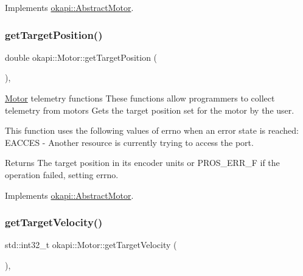 Implements \mbox{\hyperlink{classokapi_1_1AbstractMotor_aa34fefa954fbff26e3d68e59c4f10964}{okapi\+::\+Abstract\+Motor}}.

\mbox{\label{classokapi_1_1Motor_af575af2b4d4cf5aea6e8aac50ef1cbbd}} 
\subsubsection{\texorpdfstring{getTargetPosition()}{getTargetPosition()}}
{\footnotesize\ttfamily double okapi\+::\+Motor\+::get\+Target\+Position (\begin{DoxyParamCaption}{ }\end{DoxyParamCaption})\hspace{0.3cm}{\ttfamily [override]}, {\ttfamily [virtual]}}

\mbox{\hyperlink{classokapi_1_1Motor}{Motor}} telemetry functions These functions allow programmers to collect telemetry from motors Gets the target position set for the motor by the user.

This function uses the following values of errno when an error state is reached\+: E\+A\+C\+C\+ES -\/ Another resource is currently trying to access the port.

\begin{DoxyReturn}{Returns}
The target position in its encoder units or P\+R\+O\+S\+\_\+\+E\+R\+R\+\_\+F if the operation failed, setting errno. 
\end{DoxyReturn}


Implements \mbox{\hyperlink{classokapi_1_1AbstractMotor_a144377e461ec5801289c37bab5132cce}{okapi\+::\+Abstract\+Motor}}.

\mbox{\label{classokapi_1_1Motor_aee4697f4e1f39bc0206062d0247caf47}} 
\subsubsection{\texorpdfstring{getTargetVelocity()}{getTargetVelocity()}}
{\footnotesize\ttfamily std\+::int32\+\_\+t okapi\+::\+Motor\+::get\+Target\+Velocity (\begin{DoxyParamCaption}{ }\end{DoxyParamCaption})\hspace{0.3cm}{\ttfamily [override]}, {\ttfamily [virtual]}}


